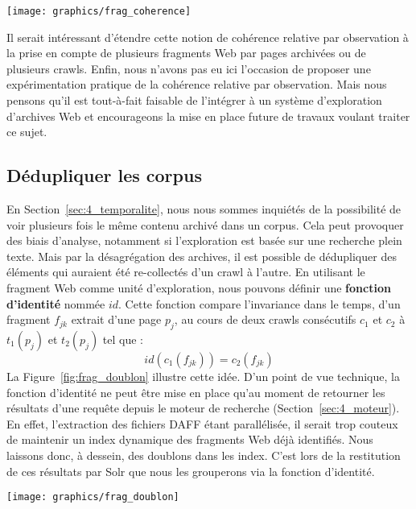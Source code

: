 \documentclass[symmetric,justified,marginals=raggedouter]{tufte-book}
\begin{document}
\newpage

\begin{figure*}%
  \texttt{[image: graphics/frag\_coherence]}
  \caption{Cohérence par observation et cohérence relative par observation}
  \label{fig:frag_coherence}
\end{figure*}

\noindent Il serait intéressant d'étendre cette notion de cohérence relative par observation à la prise en compte de plusieurs fragments Web par pages archivées ou de plusieurs crawls. Enfin, nous n'avons pas eu ici l'occasion de proposer une expérimentation pratique de la cohérence relative par observation. Mais nous pensons qu'il est tout-à-fait faisable de l'intégrer à un système d'exploration d'archives Web et encourageons la mise en place future de travaux voulant traiter ce sujet.  

\subsection{Dédupliquer les corpus}

\noindent En Section~\ref{sec:4_temporalite}, nous nous sommes inquiétés de la possibilité de voir plusieurs fois le même contenu archivé dans un corpus. Cela peut provoquer des biais d'analyse, notamment si l'exploration est basée sur une recherche plein texte. Mais par la désagrégation des archives, il est possible de dédupliquer des éléments qui auraient été re-collectés d'un crawl à l'autre. En utilisant le fragment Web comme unité d'exploration, nous pouvons définir une \textbf{fonction d'identité} nommée $id$. Cette fonction compare l'invariance dans le temps, d'un fragment $f_{jk}$ extrait d'une page $p_j$, au cours de deux crawls consécutifs $c_1$ et $c_2$ à $t_1(p_j)$ et $t_2(p_j)$ tel que :    
\[
	id(c_1(f_{jk})) = c_2(f_{jk})
\]
\noindent La Figure~\ref{fig:frag_doublon} illustre cette idée. D'un point de vue technique, la fonction d'identité ne peut être mise en place qu'au moment de retourner les résultats d'une requête depuis le moteur de recherche (Section~\ref{sec:4_moteur}). En effet, l'extraction des fichiers DAFF étant parallélisée, il serait trop couteux de maintenir un index dynamique des fragments Web déjà identifiés. Nous laissons donc, à dessein, des doublons dans les index. C'est lors de la restitution de ces résultats par Solr que nous les grouperons via la fonction d'identité.  

\newpage

\begin{figure*}%
  \texttt{[image: graphics/frag\_doublon]}
  \caption{Dédupliquer les archives Web entre deux crawls $c_1$ et $c_2$ grâce à une fonction d'identité}
  \label{fig:frag_doublon}
\end{figure*}
\end{document}
